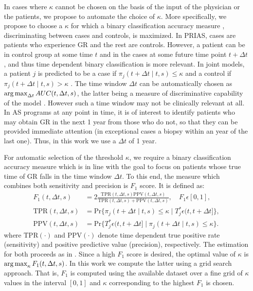 In cases where $\kappa$ cannot be chosen on the basis of the input of the physician or the patients, we propose to automate the choice of $\kappa$. More specifically, we propose to choose a $\kappa$ for which a binary classification accuracy measure \citep{lopez2014optimalcutpoints}, discriminating between cases and controls, is maximized. In PRIAS, cases are patients who experience GR and the rest are controls. However, a patient can be in control group at some time $t$ and in the cases at some future time point $t + \Delta t$, and thus time dependent binary classification is more relevant. In joint models, a patient $j$ is predicted to be a case if $\pi_j(t + \Delta t \mid t,s) \leq \kappa$ and a control if $\pi_j(t + \Delta t \mid t,s) > \kappa$ \citep*{rizopoulosJMbayes, landmarking2017}. The time window $\Delta t$ can be automatically chosen as $\operatorname{arg\,max}_{\Delta t}AUC(t, \Delta t, s)$, the latter being a measure of discriminative capability of the model \citep{rizopoulosJMbayes,landmarking2017}. However such a time window may not be clinically relevant at all. In AS programs at any point in time, it is of interest to identify patients who may obtain GR in the next 1 year from those who do not, so that they can be provided immediate attention (in exceptional cases a biopsy within an year of the last one). Thus, in this work we use a $\Delta t$ of 1 year.

For automatic selection of the threshold $\kappa$, we require a binary classification accuracy measure which is in line with the goal to focus on patients whose true time of GR falls in the time window $\Delta t$. To this end, the measure which combines both sensitivity and precision is $F_1$ score. It is defined as:
\begin{align*}
F_1(t, \Delta t, s) &= 2\frac{\mbox{TPR}(t, \Delta t, s) \mbox{PPV}(t, \Delta t, s)}{\mbox{TPR}(t, \Delta t, s) + \mbox{PPV}(t, \Delta t, s)}, \quad F_1 \epsilon [0,1],\\
\mbox{TPR}(t, \Delta t, s) &= \mbox{Pr}\big\{\pi_j(t + \Delta t \mid t,s) \leq \kappa \mid T^*_j \epsilon (t, t + \Delta t]\big\},\\
\mbox{PPV}(t, \Delta t, s) &= \mbox{Pr}\big\{T^*_j \epsilon (t, t + \Delta t] \mid \pi_j(t + \Delta t \mid t,s) \leq \kappa \big\}.
\end{align*}
where $\mbox{TPR}(\cdot)$ and $\mbox{PPV}(\cdot)$ denote time dependent true positive rate (sensitivity) and positive predictive value (precision), respectively. The estimation for both proceeds as in \citet{landmarking2017}. Since a high $F_1$ score is desired, the optimal value of $\kappa$ is $\operatorname{arg\,max}_{\kappa} F_1(t, \Delta t, s)$. In this work we compute the latter using a grid search approach. That is, $F_1$ is computed using the available dataset over a fine grid of $\kappa$ values in the interval $[0,1]$ and $\kappa$ corresponding to the highest $F_1$ is chosen.